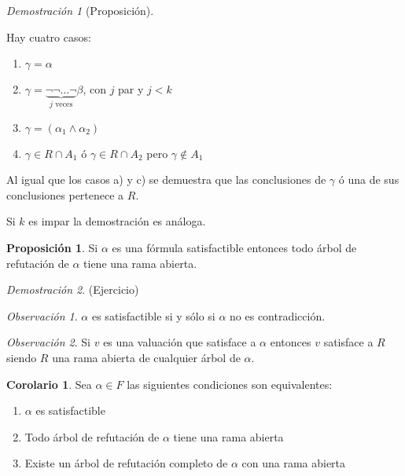 \documentclass[a4paper,11pt]{article}
\theoremstyle{definition}
\newtheorem{prop}{Proposición}[section]
\newtheorem{coro}{Corolario}[section]
\theoremstyle{remark}
\newtheorem*{remk}{Observación}
\newtheorem*{demo}{Demostración}
\begin{document}
\begin{demo}[Proposición]
\begin{itemize}
  Hay cuatro casos:
  
  \begin{enumerate}
   \item $\gamma = \alpha$
   
   \item $\gamma = \underbrace{\lnot\lnot\dots\lnot}_{j \text{ veces}}\beta$, con $j$ par y $j < k$
   
   \item $\gamma = (\alpha_1 \land \alpha_2)$
   
   \item $\gamma \in R \cap A_1$ ó $\gamma \in R \cap A_2$ pero $\gamma \not\in A_1$
  \end{enumerate}
  
  Al igual que los casos a) y c) se demuestra que las conclusiones de $\gamma$ ó una
  de sus conclusiones pertenece a $R$.
  
  Si $k$ es impar la demostración es análoga. 
 \end{itemize}
\end{demo}

\begin{prop}
 Si $\alpha$ es una fórmula satisfactible entonces todo árbol de refutación de $\alpha$
 tiene una rama abierta.
\end{prop}

\begin{demo}
 (Ejercicio)
\end{demo}

\begin{remk}
 $\alpha$ es satisfactible si y sólo si $\alpha$ no es contradicción.
\end{remk}

\begin{remk}
 Si $v$ es una valuación que satisface a $\alpha$ entonces $v$ satisface a $R$ siendo
 $R$ una rama abierta de cualquier árbol de $\alpha$.
\end{remk}

\begin{coro}
 Sea $\alpha \in F$ las siguientes condiciones son equivalentes:
 
 \begin{enumerate}
  \item $\alpha$ es satisfactible
  
  \item Todo árbol de refutación de $\alpha$ tiene una rama abierta
  
  \item Existe un árbol de refutación completo de $\alpha$ con una rama abierta
 \end{enumerate}
\end{coro}
\end{document}
